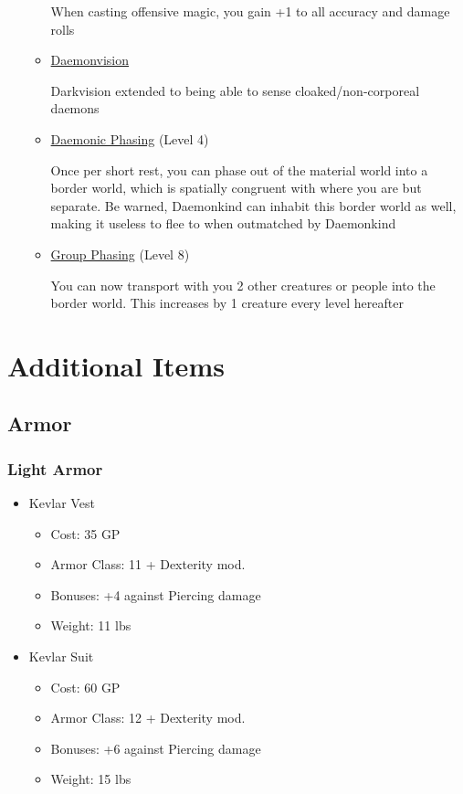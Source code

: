 \documentclass[12pt, landscape]{article}
\begin{document}
\begin{FlushLeft}
\begin{multicols}{2}
\begin{itemize}
\begin{itemize}
					When casting offensive magic, you gain +1 to all accuracy and damage rolls

					\item \underline{Daemonvision}

					Darkvision extended to being able to sense cloaked/non-corporeal daemons

					\item \underline{Daemonic Phasing} (Level 4)

					Once per short rest, you can phase out of the material world into a border world, which is spatially congruent with where you are but separate. Be warned, Daemonkind can inhabit this border world as well, making it useless to flee to when outmatched by Daemonkind

					\item \underline{Group Phasing} (Level 8)

					You can now transport with you 2 other creatures or people into the border world. This increases by 1 creature every level hereafter
				\end{itemize}
			\end{itemize}
			\vfill \pagebreak

			\section{Additional Items}

			\subsection{Armor}

			\subsubsection{Light Armor}
			\begin{itemize}
				\item Kevlar Vest
				\begin{itemize}
					\item Cost: 35 GP
					\item Armor Class: 11 + Dexterity mod.
					\item Bonuses: +4 against Piercing damage
					\item Weight: 11 lbs
				\end{itemize}
				\item Kevlar Suit
				\begin{itemize}
					\item Cost: 60 GP
					\item Armor Class: 12 + Dexterity mod.
					\item Bonuses: +6 against Piercing damage
					\item Weight: 15 lbs
				\end{itemize}
			\end{itemize}


\end{multicols}
\end{FlushLeft}
\end{document}
